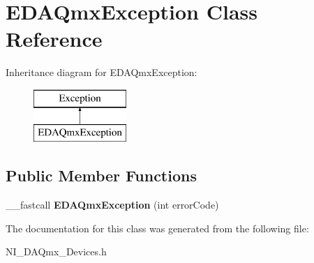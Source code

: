 \hypertarget{class_e_d_a_qmx_exception}{\section{E\+D\+A\+Qmx\+Exception Class Reference}
\label{class_e_d_a_qmx_exception}
}
Inheritance diagram for E\+D\+A\+Qmx\+Exception\+:\begin{figure}[H]
\begin{center}
\leavevmode
\includegraphics[height=2.000000cm]{class_e_d_a_qmx_exception}
\end{center}
\end{figure}
\subsection*{Public Member Functions}
\begin{DoxyCompactItemize}
\item 
\hypertarget{class_e_d_a_qmx_exception_ad7a3e3c901512689c385f2b0beb5aaa8}{\+\_\+\+\_\+fastcall {\bfseries E\+D\+A\+Qmx\+Exception} (int error\+Code)}\label{class_e_d_a_qmx_exception_ad7a3e3c901512689c385f2b0beb5aaa8}

\end{DoxyCompactItemize}


The documentation for this class was generated from the following file\+:\begin{DoxyCompactItemize}
\item 
N\+I\+\_\+\+D\+A\+Qmx\+\_\+\+Devices.\+h\end{DoxyCompactItemize}

